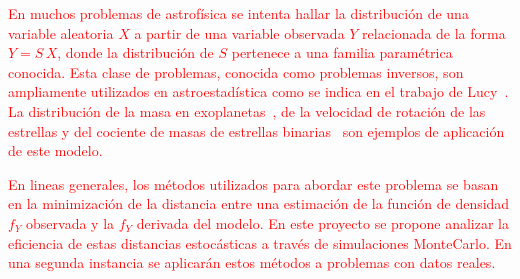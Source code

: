 \documentclass[11pt]{article}
\begin{document}
%
%
\textcolor{red}{
En muchos problemas de astrofísica se intenta hallar la distribución de una variable aleatoria $X$ a partir de una variable observada $Y$ relacionada de la forma $Y = S\,X$, donde la distribución de $S$ pertenece
a una familia paramétrica conocida. Esta clase de problemas, conocida como problemas inversos, son ampliamente utilizados en astroestadística como se indica en el trabajo de Lucy~\cite{Lucy1994}. La distribución de la masa en exoplanetas~\cite{Jorissen2001},  de la velocidad de rotación de las estrellas y del cociente de masas de estrellas binarias~\cite{Cure2014,Cure2015} son ejemplos de aplicación de este modelo.
}

\textcolor{red}{
En lineas generales, los métodos utilizados para abordar este problema se basan en la minimización de la distancia entre una estimación de la función de densidad $f_{Y}$ observada y la $f_{Y}$ derivada del modelo. 
En este proyecto se propone analizar la eficiencia de estas distancias estocásticas a través de simulaciones MonteCarlo. En una segunda instancia se aplicarán estos métodos a problemas con datos reales.
}
% 
\end{document}
